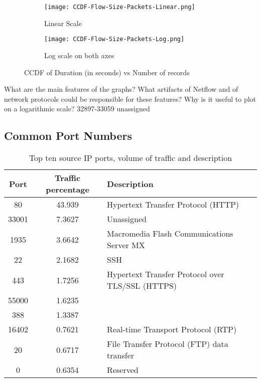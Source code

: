 \documentclass[11pt,a4paper,titlepage]{article}
\begin{document}
\begin{figure}[H]
\centering
\begin{subfigure}{.5\textwidth}
  \centering
  \texttt{[image: CCDF-Flow-Size-Packets-Linear.png]}
  \caption{Linear Scale}
  \label{fig:sub1}
\end{subfigure}%
\begin{subfigure}{.5\textwidth}
  \centering
  \texttt{[image: CCDF-Flow-Size-Packets-Log.png]}
  \caption{Log scale on both axes}
  \label{fig:sub2}
\end{subfigure}
\caption{CCDF of Duration (in seconds) vs Number of records}
\label{fig:test}
\end{figure}
What are the main features of
the graphs? 
What artifacts of Netflow and of network protocols could be responsible for
these features?
Why is it useful to plot on a logarithmic scale?
32897-33059	unassigned

\subsection{Common Port Numbers}

\begin{table}[H]
	\centering
	\begin{tabular}{ |c|c|l| } 
		\hline
		\textbf{Port} & \textbf{Traffic percentage} & \textbf{Description} \\ \hline
		80      & 43.939    & Hypertext Transfer Protocol (HTTP) \\ \hline
		33001   & 7.3627    & Unassigned \\ \hline 
		1935    & 3.6642    & Macromedia Flash Communications Server MX\\ \hline
		22      & 2.1682    & SSH \\ \hline
		443     & 1.7256    & Hypertext Transfer Protocol over TLS/SSL (HTTPS)\\ \hline
		55000   & 1.6235    & \\ \hline
		388     & 1.3387    & \\ \hline
		16402   & 0.7621    & Real-time Transport Protocol (RTP)\\ \hline
		20      & 0.6717    & File Transfer Protocol (FTP) data transfer\\ \hline
		0       & 0.6354    & Reserved \\ \hline
	\end{tabular}
	\caption{Top ten source IP ports, volume of traffic and description}
\end{table}
\end{document}
